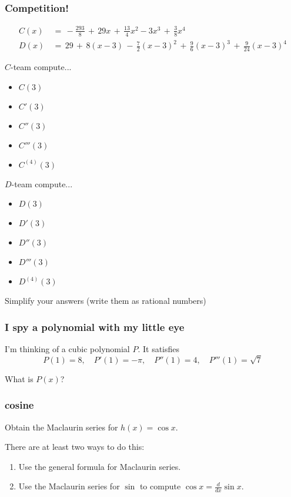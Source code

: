 \documentclass[14pt]{beamer}
\newcommand {\DS} [1] {${\displaystyle #1}$}
\newcommand{\p}{\pause}
\newcommand{\setsize}[1]{\fontsize{#1}{#1}\selectfont} %
\newcommand{\smallerfont}{\setsize{13}} %
\newcommand{\vvv}{\vspace{.2cm}}
\begin{document}
\begin{frame}[t]
\frametitle{Competition!}
\vspace{-.8cm}
{\smallerfont
		\begin{align*}
			C(x) & \, = \,  -\frac{293}{8} \, + \, 29x \, + \, \frac{13}{4}x^2-3x^3 \, + \, \frac{3}{8}x^4  \phantom{\int}
				\\
			D(x) & \, = \,  29 \, + \,  8(x -3) \, - \, \frac{7}{2} (x-3)^2 
					\, + \,  \frac{9}{6}(x-3)^3 \, + \, \frac{9}{24}(x-3)^4
		\end{align*}
}
\p
\vspace{-1cm}

\begin{multicols}{2}
$C$-team compute...
\begin{itemize}
	\item $C(3)$
	\item $C'(3)$
	\item $C''(3)$
	\item $C'''(3)$
	\item $C^{(4)}(3)$
\end{itemize}

$D$-team compute...
\begin{itemize}
	\item $D(3)$
	\item $D'(3)$
	\item $D''(3)$
	\item $D'''(3)$
	\item $D^{(4)}(3)$
\end{itemize}
\end{multicols}
Simplify your answers (write them as rational numbers)
\end{frame}
\begin{frame}[t]
\frametitle{I spy a polynomial with my little eye}

I'm thinking of a cubic polynomial $P$.  It satisfies
	$$
		P(1)=8, \quad
		P'(1)=-\pi, \quad
		P''(1) = 4, \quad
		P'''(1) = \sqrt{7}
	$$

What is $P(x)$?

\end{frame}
\begin{frame}[t]
\frametitle{cosine}

Obtain the Maclaurin series for $h(x) = \cos x$.

There are at least two ways to do this:
\vvv
	\begin{enumerate}
		\item  Use the general formula for Maclaurin series.
\vvv
		\item  Use the Maclaurin series for $\sin$ to compute \DS{\cos x = \frac{d}{dx} \sin x}.
	\end{enumerate}

\end{frame}
\end{document}
